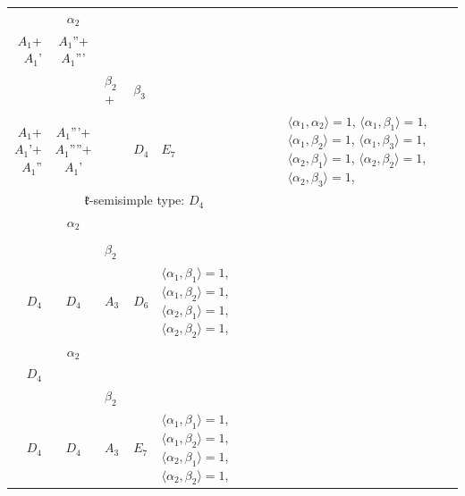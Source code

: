 \documentclass[12pt]{report}
\begin{document}
\begin{appendix}
{\begin{longtable}{rcl p{1cm}p{1cm}p{3cm} }
\\
\begin{tabular}{cc}$\alpha_1$+ & $\alpha_2$\\\tiny{ $A_1$+$A_1$' } & \tiny{ $A_1$''+$A_1$''' }\end{tabular} &\begin{tabular}{c} = \\~ \end{tabular} & \begin{tabular}{ccc}$\beta_1$+ & $\beta_2$+ & $\beta_3$\\\tiny{ $A_1$+$A_1$'+$A_1$'' } & \tiny{ $A_1$'''+$A_1$''''+$A_1$' } & \tiny{  }\end{tabular} & $D_4$ & $E_7$ & $\langle\alpha_1, \alpha_2\rangle=1$,  $\langle\alpha_1, \beta_1\rangle=1$, $\langle\alpha_1, \beta_2\rangle=1$, $\langle\alpha_1, \beta_3\rangle=1$, $\langle\alpha_2, \beta_1\rangle=1$, $\langle\alpha_2, \beta_2\rangle=1$, $\langle\alpha_2, \beta_3\rangle=1$, 
\\
\hline\multicolumn{5}{c}{$\mathfrak{k}$-semisimple type: $D_4$}\\
\hline\hline\begin{tabular}{cc}$\alpha_1$+ & $\alpha_2$\\\tiny{  } & \tiny{  }\end{tabular} &\begin{tabular}{c} = \\~ \end{tabular} & \begin{tabular}{cc}$\beta_1$+ & $\beta_2$\\\tiny{ $D_4$ } & \tiny{ $D_4$ }\end{tabular} & $A_3$ & $D_6$ &  $\langle\alpha_1, \beta_1\rangle=1$, $\langle\alpha_1, \beta_2\rangle=1$, $\langle\alpha_2, \beta_1\rangle=1$, $\langle\alpha_2, \beta_2\rangle=1$, 
\\
\begin{tabular}{cc}$\alpha_1$+ & $\alpha_2$\\\tiny{ $D_4$ } & \tiny{  }\end{tabular} &\begin{tabular}{c} = \\~ \end{tabular} & \begin{tabular}{cc}$\beta_1$+ & $\beta_2$\\\tiny{ $D_4$ } & \tiny{ $D_4$ }\end{tabular} & $A_3$ & $E_7$ &  $\langle\alpha_1, \beta_1\rangle=1$, $\langle\alpha_1, \beta_2\rangle=1$, $\langle\alpha_2, \beta_1\rangle=1$, $\langle\alpha_2, \beta_2\rangle=1$, 

\end{longtable}}
\end{appendix}
\end{document}
